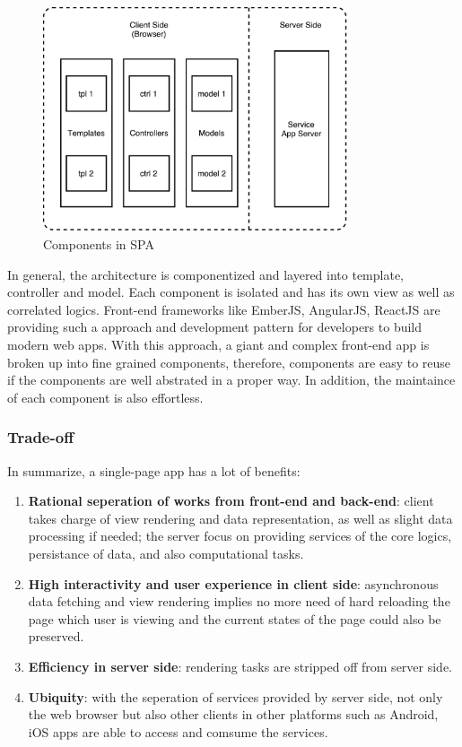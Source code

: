 \begin{figure}[!htbp]
  \centering
    \includegraphics[width=0.8\textwidth]{Figures/tech-web-arch-cmp.pdf}
  \caption{Components in SPA}
  \label{fig:3.4}
\end{figure}

In general, the architecture is componentized and layered into template, controller and model. Each component is isolated and has its own view as well as correlated logics. Front-end frameworks like EmberJS, AngularJS, ReactJS are providing such a approach and development pattern for developers to build modern web apps. With this approach, a giant and complex front-end app is broken up into fine grained components, therefore, components are easy to reuse if the components are well abstrated in a proper way. In addition, the maintaince of each component is also effortless.


\subsubsection{Trade-off}
In summarize, a single-page app has a lot of benefits:
\begin{enumerate}
\item
\textbf{Rational seperation of works from front-end and back-end}: client takes charge of view rendering and data representation, as well as slight data processing if needed; the server focus on providing services of the core logics, persistance of data, and also computational tasks.
\item
\textbf{High interactivity and user experience in client side}: asynchronous data fetching and view rendering implies no more need of hard reloading the page which user is viewing and the current states of the page could also be preserved.
\item
\textbf{Efficiency in server side}: rendering tasks are stripped off from server side.
\item
\textbf{Ubiquity}: with the seperation of services provided by server side, not only the web browser but also other clients in other platforms such as Android, iOS apps are able to access and comsume the services.
\end{enumerate}

